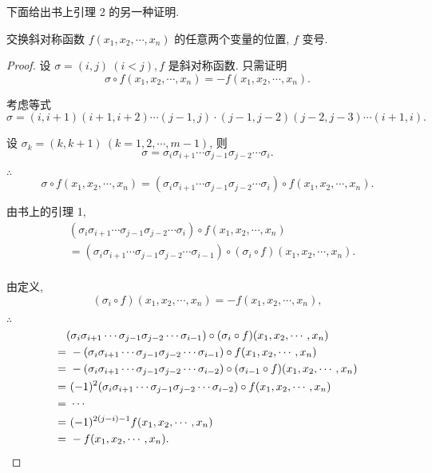 \documentclass[color=black,device=normal,lang=cn,mode=geye]{elegantnote}
\begin{document}
下面给出书上引理 2 的另一种证明.
\begin{lemma}[书上的引理 2]
    交换斜对称函数 $f(x_1,x_2,\cdots,x_n)$ 的任意两个变量的位置, $f$ 变号.
\end{lemma}
\begin{proof}
    设 $\sigma=(i,j)\ (i<j),f$ 是斜对称函数. 只需证明
    \[\sigma\circ f(x_1,x_2,\cdots,x_n)=-f(x_1,x_2,\cdots,x_n).\]

    考虑等式
    \[\sigma=(i,i+1)(i+1,i+2)\cdots(j-1,j)\cdot(j-1,j-2)(j-2,j-3)\cdots(i+1,i).\]

    设 $\sigma_k=(k,k+1)\ (k=1,2,\cdots,m-1)$, 则
    \[\sigma=\sigma_i\sigma_{i+1}\cdots\sigma_{j-1}\sigma_{j-2}\cdots\sigma_i.\]

    $\therefore$
    \[\sigma\circ f(x_1,x_2,\cdots,x_n)=(\sigma_i\sigma_{i+1}\cdots\sigma_{j-1}\sigma_{j-2}\cdots\sigma_i)\circ f(x_1,x_2,\cdots,x_n).\]

    由书上的引理 1,
    \begin{align*}
        & (\sigma_i\sigma_{i+1}\cdots\sigma_{j-1}\sigma_{j-2}\cdots\sigma_i)\circ f(x_1,x_2,\cdots,x_n) \\
        & =(\sigma_i\sigma_{i+1}\cdots\sigma_{j-1}\sigma_{j-2}\cdots\sigma_{i-1})\circ(\sigma_i\circ f)(x_1,x_2,\cdots,x_n). \\
    \end{align*}

    由定义,
    \[(\sigma_i\circ f)(x_1,x_2,\cdots,x_n)=-f(x_1,x_2,\cdots,x_n),\]

    $\therefore$
    \begin{align*}
        & (\sigma_i\sigma_{i+1}\cdots\sigma_{j-1}\sigma_{j-2}\cdots\sigma_{i-1})\circ(\sigma_i\circ f)(x_1,x_2,\cdots,x_n)\\
        = & \ -(\sigma_i\sigma_{i+1}\cdots\sigma_{j-1}\sigma_{j-2}\cdots\sigma_{i-1})\circ f(x_1,x_2,\cdots,x_n) \\
        = & \ -(\sigma_i\sigma_{i+1}\cdots\sigma_{j-1}\sigma_{j-2}\cdots\sigma_{i-2})\circ(\sigma_{i-1}\circ f)(x_1,x_2,\cdots,x_n) \\
        = & \ (-1)^2(\sigma_i\sigma_{i+1}\cdots\sigma_{j-1}\sigma_{j-2}\cdots\sigma_{i-2})\circ f(x_1,x_2,\cdots,x_n) \\
        = & \ \cdots \\
        = & \ (-1)^{2(j-i)-1}f(x_1,x_2,\cdots,x_n) \\
        = & \ -f(x_1,x_2,\cdots,x_n).\qedhere
    \end{align*}
\end{proof}
\end{document}
